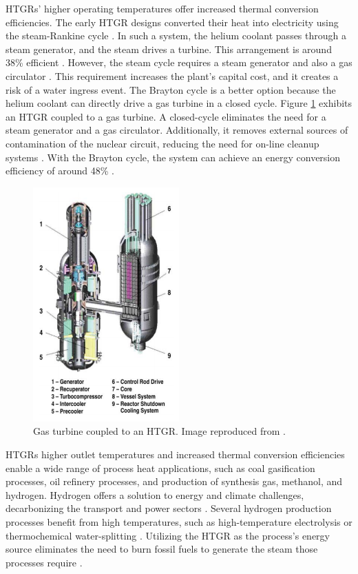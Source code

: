 HTGRs' higher operating temperatures offer increased thermal conversion efficiencies.
The early \gls{HTGR} designs converted their heat into electricity using the steam-Rankine cycle \cite{herranz_power_2009}.
In such a system, the helium coolant passes through a steam generator, and the steam drives a turbine.
This arrangement is around 38\% efficient \cite{breeze_nuclear_2014}.
However, the steam cycle requires a steam generator and also a gas circulator \cite{no_review_2007}.
This requirement increases the plant's capital cost, and it creates a risk of a water ingress event.
The Brayton cycle is a better option because the helium coolant can directly drive a gas turbine in a closed cycle.
Figure \ref{fig:gt-mhr} exhibits an HTGR coupled to a gas turbine.
A closed-cycle eliminates the need for a steam generator and a gas circulator.
Additionally, it removes external sources of contamination of the nuclear circuit, reducing the need for on-line cleanup systems \cite{iaea_current_2001}.
With the Brayton cycle, the system can achieve an energy conversion efficiency of around 48\% \cite{breeze_nuclear_2014}.

\begin{figure}[htbp!]
	\centering
	\includegraphics[height=9.0cm]{figures/gt-mhr3}
	\caption{Gas turbine coupled to an HTGR. Image reproduced from \cite{baxi_evaluation_2008}.}
	\label{fig:gt-mhr}
\end{figure}

HTGRs higher outlet temperatures and increased thermal conversion efficiencies enable a wide range of process heat applications, such as coal gasification processes, oil refinery processes, and production of synthesis gas, methanol, and hydrogen.
Hydrogen offers a solution to energy and climate challenges, decarbonizing the transport and power sectors \cite{nagashima_japans_2018}.
Several hydrogen production processes benefit from high temperatures, such as high-temperature electrolysis \cite{doenitz_hydrogen_1980} or thermochemical water-splitting \cite{yildiz_efficiency_2006}.
Utilizing the \gls{HTGR} as the process's energy source eliminates the need to burn fossil fuels to generate the steam those processes require \cite{iaea_current_2001}.

